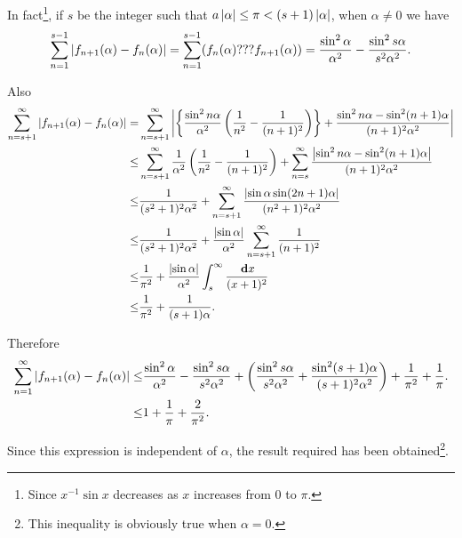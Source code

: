 In fact\footnote{Since $x^{-1} \sin x$ decreases as $x$ increases from $0$ to $\pi$.},
if $s$ be the integer such that
$a \left| \alpha \right| \leq \pi < (s+1) \left| \alpha \right|$,
when $\alpha \neq 0$ we have
$$
\sum_{n=1}^{s-1}
\absval{
  f_{n+1}(\alpha) - f_{n}(\alpha)
}
=
\sum_{n=1}^{s-1}
(
f_{n}(\alpha)
??? %
f_{n+1}(\alpha)
)
=
\frac{ \sin^{2} \alpha }{\alpha^{2}}
-
\frac{ \sin^{2} s\alpha }{s^{2} \alpha^{2}}.
$$
%
%

Also
\begin{align*}
  \sum_{n=s+1}^{\infty}
  \left| 
    f_{n+1}(\alpha) - f_{n}(\alpha)
   \right|
  =&
  \sum_{n=s+1}^{\infty}
  \left| 
    \left\{ 
      \frac{\sin^{2} n\alpha}{\alpha^{2}}
      \left( 
        \frac{1}{n^{2}}
        -
        \frac{1}{(n+1)^{2}}
       \right)
     \right\}
    +
    \frac{\sin^{2} n\alpha - \sin^{2} (n+1)\alpha }{(n+1)^{2} \alpha^{2}}
   \right|
  \\
  \leq &
  \sum_{n=s+1}^{\infty}
  \frac{1}{\alpha^{2}}
  \left( 
    \frac{1}{n^{2}}
    -
    \frac{1}{ (n+1)^{2} }
   \right)
  +
  \sum_{n=s}^{\infty}
  \frac{\left| 
      \sin^{2} n\alpha - \sin^{2} (n+1)\alpha
     \right|}{ (n+1)^{2} \alpha^{2} }
  \\
  \leq &
  \frac{1}{ (s^{2} + 1)^{2} \alpha^{2} }
  +
  \sum_{n=s+1}^{\infty}
  \frac{\left| 
      \sin \alpha \sin (2n+1)\alpha
     \right|}{ (n^{2} + 1)^{2} \alpha^{2} }
  \\
  \leq &
  \frac{1}{ (s^{2} + 1)^{2} \alpha^{2} }
  +
  \frac{\left| \sin \alpha \right|}{\alpha^{2}}
  \sum_{n=s+1}^{\infty}
  \frac{1}{(n+1)^{2}}
  \\
  \leq &
  \frac{1}{\pi^{2}}
  +
  \frac{\left| \sin \alpha \right|}{\alpha^{2}}
  \int_{s}^{\infty}
  \frac{\, \mathbf{d} x}{(x+1)^{2}}
  \\
  \leq &
  \frac{1}{\pi^{2}}
  +
  \frac{1}{(s+1) \alpha}.
\end{align*}

Therefore
\begin{align*}
  \sum_{n=1}^{\infty}
  \left| 
    f_{n+1}(\alpha) - f_{n}(\alpha)
   \right|
  \leq &
  \frac{\sin^{2} \alpha}{\alpha^{2}}
  -
  \frac{\sin^{2} s\alpha}{s^{2}\alpha^{2}}
  +
  \left( 
    \frac{\sin^{2} s\alpha}{s^{2}\alpha^{2}}
    +
    \frac{\sin^{2} (s+1)\alpha}{(s+1)^{2}\alpha^{2}}
   \right)
  + \frac{1}{\pi^{2}} + \frac{1}{\pi}.
  \\
  \leq &
  1 + \frac{1}{\pi} + \frac{2}{\pi^{2}}.
\end{align*}

Since this expression is independent of $\alpha$, the result required has
been obtained\footnote{This inequality is obviously true when $\alpha = 0$.}.

